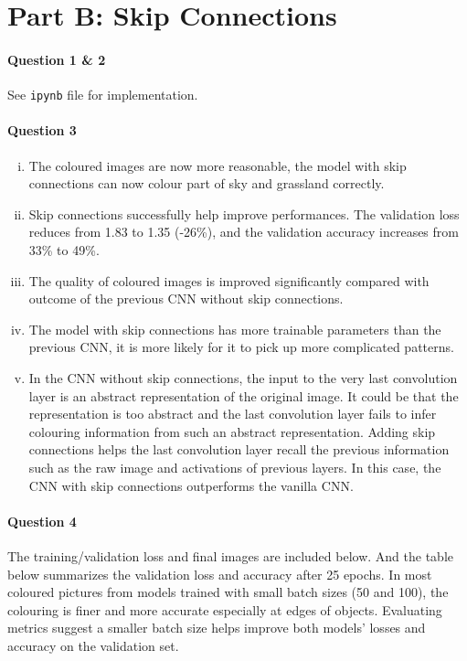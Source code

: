 \documentclass[12pt]{article}
\begin{document}
	\section{Part B: Skip Connections}
	\paragraph{Question 1 \& 2} See \texttt{ipynb} file for implementation.
	\paragraph{Question 3}
	\begin{enumerate}[(i)]
		\item The coloured images are now more reasonable, the model with skip connections can now colour part of sky and grassland correctly.
		\item Skip connections successfully help improve performances. The validation loss reduces from 1.83 to 1.35 (-26\%), and the validation accuracy increases from 33\% to 49\%.
		\item The quality of coloured images is improved significantly compared with outcome of the previous CNN without skip connections.
		\item The model with skip connections has more trainable parameters than the previous CNN, it is more likely for it to pick up more complicated patterns.
		\item In the CNN without skip connections, the input to the very last convolution layer is an abstract representation of the original image. It could be that the representation is too abstract and the last convolution layer fails to infer colouring information from such an abstract representation. Adding skip connections helps the last convolution layer recall the previous information such as the raw image and activations of previous layers. In this case, the CNN with skip connections outperforms the vanilla CNN.
	\end{enumerate}
	\paragraph{Question 4} The training/validation loss and final images are included below. And the table below summarizes the validation loss and accuracy after 25 epochs. In most coloured pictures from models trained with small batch sizes (50 and 100), the colouring is finer and more accurate especially at edges of objects. Evaluating metrics suggest a smaller batch size helps improve both models' losses and accuracy on the validation set.
	
\end{document}
